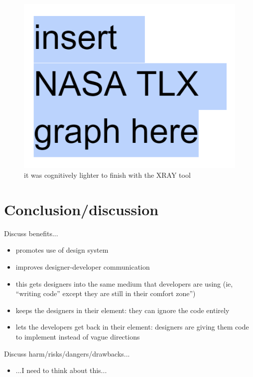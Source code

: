 \documentclass{sigchi}
\begin{document}
\begin{figure}
    \centering
    \includegraphics[width=\columnwidth]{figures/nasa_tlx.PNG}
    \caption{it was cognitively lighter to finish with the XRAY tool}  
    \label{fig:xray_screenshot}
\end{figure}

\section{Conclusion/discussion}
Discuss benefits...
\begin{itemize}
    \item promotes use of design system
    \item improves designer-developer communication
    \item this gets designers into the same medium that developers are using (ie, ``writing code'' except they are still in their comfort zone'')
    \item keeps the designers in their element: they can ignore the code entirely
    \item lets the developers get back in their element: designers are giving them code to implement instead of vague directions 

\end{itemize}

Discuss harm/risks/dangers/drawbacks...
\begin{itemize}
    \item ...I need to think about this...
\end{itemize}
\end{document}
